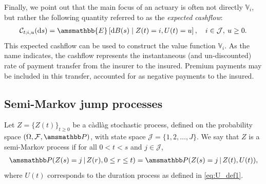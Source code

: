 \documentclass[11pt,leqno]{amsart}
\numberwithin{table}{section}
\numberwithin{figure}{section}
\numberwithin{equation}{section}
\newcommand{\dd}{\mathrm{d}}
\newcommand{\1}{{\mathds{1}}}
\newcommand{\0}{\mat{0}}
\newcommand{\E}{\amsmathbb{E}}
\renewcommand{\P }{{\amsmathbb P}}
\newcommand{\ap}[1]{\mathbb{#1}}
\begin{document}
{ Finally, we point out that the main focus of an actuary is often not directly $\ap{V}_{i}$, but rather the following quantity referred to as the \textit{expected cashflow}:
\begin{align}\label{cashflow_definition}
{ \mathcal{C}_{t;i,u}(\dd s) = \E\left[\dd B(s) \mid Z(t) = i, U(t) = u\right],\quad i\in\mathcal{J},\: u\ge0.}
\end{align}
This expected cashflow can be used to construct the value function $\ap{V}_{i}$. As the name indicates, the cashflow represents the  instantaneous (and un-discounted) rate of payment transfer from the insurer to the insured. Premium payments may be included in this transfer, accounted for as negative payments to the insured.}



\subsection{Semi-Markov jump processes}\label{sec:SMJP}

Let $Z=\{Z(t)\}_{t\ge 0}$ be a c\`adl\`ag stochastic process, defined on the probability space $(\Omega,\mathcal{F},\P)$, with state space $\mathcal{J}=\{1,2,\dots, J\}$. We say that $Z$ is a semi-Markov process if for all $0<t<s$ and $j\in\mathcal{J}$,
\begin{align*}
\P(Z(s)=j\,|\,Z(r), 0\le r\le t) =\P(Z(s)=j\,|\,Z(t), U(t)),
\end{align*} 
where { $U(t)$ corresponds to the duration process as defined in \eqref{eq:U_def1}.}
\end{document}

